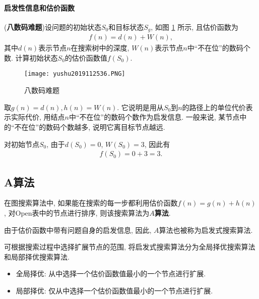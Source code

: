 \paragraph{启发性信息和估价函数}
\begin{example}\label{AI32C4exam08}
    (\textbf{八数码难题})设问题的初始状态$S_0$和目标状态$S_g$, 如图 \ref{AI32fig2019120134} 所示, 且估价函数为
\begin{align}
    f(n)=d(n)+W(n),
\end{align}
其中$d(n)$表示节点$n$在搜索树中的深度, $W(n)$表示节点$n$中“不在位”的数码个数. 计算初始状态$S_0$的估价函数值$f(S_0)$.
\end{example}
\begin{figure}[H]
    \centering
    \texttt{[image: yushu2019112536.PNG]}
    \caption{八数码难题}
    \label{AI32fig2019120134}
\end{figure}
\begin{result}
取$g(n)=d(n), h(n)=W(n)$. 它说明是用从$S_0$到$n$的路径上的单位代价表示实际代价, 用结点$n$中“不在位”的数码个数作为启发信息.
一般来说, 某节点中的“不在位”的数码个数越多, 说明它离目标节点越远.

\begin{example}
    对初始节点$S_0$, 由于$d(S_0)=0$, $W(S_0)=3$, 因此有
\begin{align}
    f(S_0)=0+3=3.
\end{align}
\end{example}
\end{result}
\subsection{A算法}
在图搜索算法中, 如果能在搜索的每一步都利用估价函数$f(n)=g(n)+h(n)$, 对Open表中的节点进行排序, 则该搜索算法为\textbf{$A$算法}.
\begin{remark}
    由于估价函数中带有问题自身的启发信息, 因此, $A$算法也被称为启发式搜索算法.
\end{remark}
\begin{remark}
    可根据搜索过程中选择扩展节点的范围, 将启发式搜索算法分为全局择优搜索算法和局部择优搜索算法.
\end{remark}

\begin{itemize}
	\item \textcolor[rgb]{0,0,1}{全局择优}: 从中选择一个估价函数值最小的一个节点进行扩展.
	\item \textcolor[rgb]{0,0,1}{局部择优}: 仅从中选择一个估价函数值最小的一个节点进行扩展.
\end{itemize}
